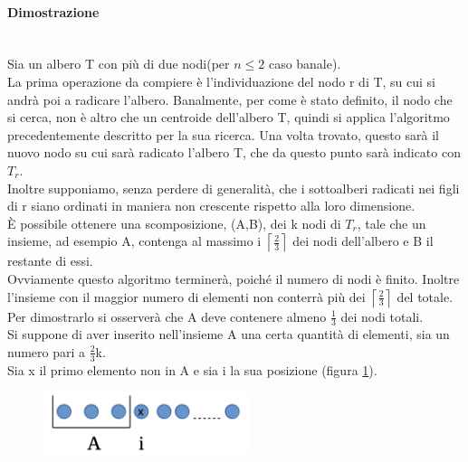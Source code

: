 \paragraph{Dimostrazione}\mbox{}\\
Sia un albero T con pi\`u di due nodi(per $n\le2$ caso banale). \\
La prima operazione da compiere \`e l’individuazione del nodo r di T, su cui si andr\`a poi a radicare l’albero.
Banalmente, per come \`e stato definito, il nodo che si cerca, non \`e altro che  un centroide dell’albero T, quindi si applica l’algoritmo precedentemente descritto per la sua ricerca.
Una volta trovato, questo sar\`a il nuovo nodo su cui sar\`a radicato l’albero T, che da questo punto sar\`a indicato con $T_r$.
\\ 
Inoltre supponiamo, senza perdere di generalit\`a, che i sottoalberi radicati nei figli di r siano ordinati in maniera non crescente rispetto alla loro dimensione.\\
\`E possibile ottenere una scomposizione, (A,B), dei k nodi di $T_r$,  tale che un insieme, ad esempio A, contenga al massimo i $\left\lceil \frac{2}{3} \right\rceil$ dei nodi dell’albero e B il restante di essi.\\
Ovviamente questo algoritmo terminer\`a, poich\'e il numero di nodi \`e finito.
Inoltre l’insieme con il maggior numero di elementi non conterr\`a pi\`u dei $\left\lceil \frac{2}{3} \right\rceil$ del totale. \\
Per dimostrarlo si osserver\`a che A deve contenere almeno $\frac{1}{3}$ dei nodi totali. \\
Si suppone di aver inserito nell’insieme A una certa quantit\`a di elementi, sia un numero pari a $\frac{2}{3}$k. \\
Sia x il primo elemento non in A e sia i la sua posizione (figura \ref{fig:4}).
	\begin{figure}[htbp]
	\centering
	\includegraphics[width=6cm]{capitolo3/3}
	\caption{}
	\label{fig:4}
\end{figure}

